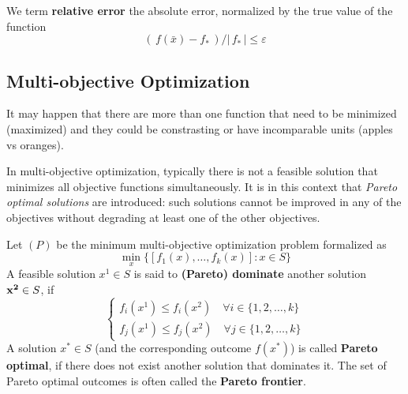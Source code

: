 \documentclass[computationalMathematics.tex]{subfiles}
\begin{document}
\begin{definition}
  We term \textbf{relative error} the absolute error, normalized by the true value of the function
\[
  ( \, f(\bar{x}) - f_* \, ) / | \, f_* \, | \leq \varepsilon
\]
\end{definition}

\subsection{Multi-objective Optimization}
It may happen that there are more than one function that need to be minimized (maximized) and they could be constrasting or have incomparable units (apples vs oranges).

In multi-objective optimization, typically there is not a feasible solution that minimizes all objective functions simultaneously.
It is in this context that \emph{Pareto optimal solutions} are introduced: such solutions cannot be improved in any of the objectives without degrading at least one of the other objectives.

\begin{definition}
	Let $(P)$ be the minimum multi-objective optimization problem formalized as
	\[
	\min\limits_x \{ [f_1(x), \ldots, f_k(x)] : x \in S\}
	\]
   A feasible solution $x^1 \in S$ is said to \textbf{(Pareto) dominate} another solution ${\bf x^2 } \in S$, if
\[
  \begin{cases}
  f_{i}(x^1)\leq f_{i}(x^2)\quad \forall i \in \{ 1,2,\dots ,k\}\\
  f_{j}(x^{1})\leq f_{j}(x^{2})\quad \forall j \in \{ 1,2,\dots ,k\}
  \end{cases}
\]
A solution $x^{*}\in S$ (and the corresponding outcome $f(x^{*})$) is called \textbf{Pareto optimal}, if there does not exist another solution that dominates it. The set of Pareto optimal outcomes is often called the \textbf{Pareto frontier}.
\end{definition}

\end{document}

